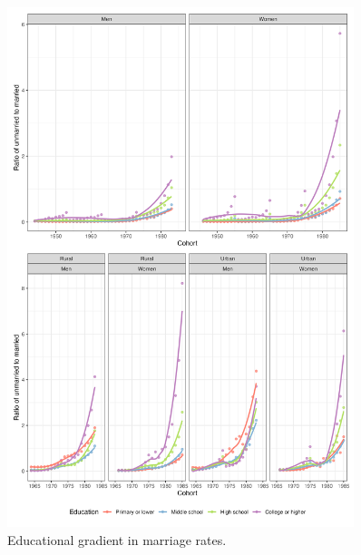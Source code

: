 \begin{figure}[H]
    \centering
    \includegraphics[width=0.9\textwidth]{chapters/chapter4/figures/gradient.png}
    \caption{Educational gradient in marriage rates.}
    \label{fig:gradient}
\end{figure}

